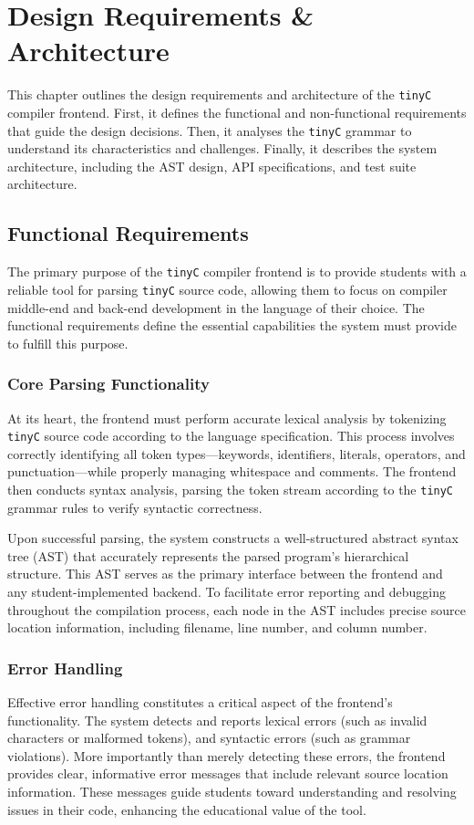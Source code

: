 \chapter{Design Requirements \& Architecture}

This chapter outlines the design requirements and architecture of the \texttt{tinyC} compiler frontend. First, it defines the functional and non-functional requirements that guide the design decisions. Then, it analyses the \texttt{tinyC} grammar to understand its characteristics and challenges. Finally, it describes the system architecture, including the AST design, API specifications, and test suite architecture.

\section{Functional Requirements}

The primary purpose of the \texttt{tinyC} compiler frontend is to provide students with a reliable tool for parsing \texttt{tinyC} source code, allowing them to focus on compiler middle-end and back-end development in the language of their choice. The functional requirements define the essential capabilities the system must provide to fulfill this purpose.

\subsection{Core Parsing Functionality}
At its heart, the frontend must perform accurate lexical analysis by tokenizing \texttt{tinyC} source code according to the language specification. This process involves correctly identifying all token types—keywords, identifiers, literals, operators, and punctuation—while properly managing whitespace and comments. The frontend then conducts syntax analysis, parsing the token stream according to the \texttt{tinyC} grammar rules to verify syntactic correctness.

Upon successful parsing, the system constructs a well-structured abstract syntax tree (AST) that accurately represents the parsed program's hierarchical structure. This AST serves as the primary interface between the frontend and any student-implemented backend. To facilitate error reporting and debugging throughout the compilation process, each node in the AST includes precise source location information, including filename, line number, and column number.


\subsection{Error Handling}
Effective error handling constitutes a critical aspect of the frontend's functionality. The system detects and reports lexical errors (such as invalid characters or malformed tokens), and syntactic errors (such as grammar violations). More importantly than merely detecting these errors, the frontend provides clear, informative error messages that include relevant source location information. These messages guide students toward understanding and resolving issues in their code, enhancing the educational value of the tool.


